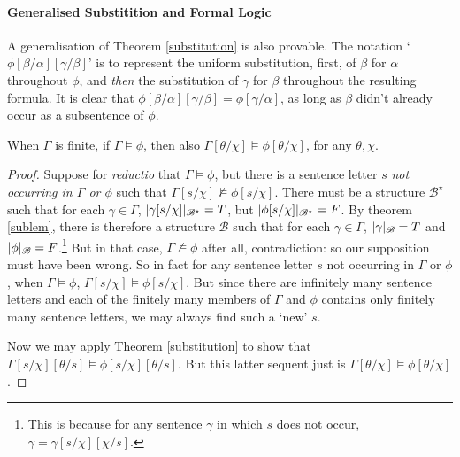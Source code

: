 \paragraph{Generalised Substitition and Formal Logic} A generalisation of Theorem \ref{substitution} is also provable. The notation ‘$\phi[\beta/\alpha][\gamma/\beta]$’ is to represent the uniform substitution, first, of $\beta$ for $\alpha$ throughout $\phi$, and \emph{then} the substitution of $\gamma$ for $\beta$ throughout the resulting formula. It is clear that $\phi[\beta/\alpha][\gamma/\beta] = \phi[\gamma/\alpha]$, as long as $\beta$ didn't already occur as a subsentence of $
\phi$. \begin{theorem}\label{generalsub}
	When $\Gamma$ is finite, if $\Gamma \vDash \phi$, then also $\Gamma[\theta/\chi] \vDash \phi[\theta/\chi]$, for any $\theta, \chi$. \begin{proof}
		Suppose for \emph{reductio} that $\Gamma \vDash \phi$, but there is a sentence letter $s$ \emph{not occurring in $\Gamma$ or $\phi$} such that $\Gamma[s/\chi] \nvDash\phi[s/\chi]$. There must be a structure $\mathscr{B^{\star}}$ such that for each $\gamma \in \Gamma$, $|\gamma[s/\chi]|_{\mathscr{B^{\star}}}=T$, but $|\phi[s/\chi]|_{\mathscr{B^{\star}}}=F$.
		By theorem \ref{sublem}, there is therefore a structure $\mathscr{B}$ such that for each $\gamma \in \Gamma$, $|\gamma|_{\mathscr{B}}=T$ and $|\phi|_{\mathscr{B}}=F$.\footnote{This is because for any sentence $\gamma$ in which $s$ does not occur, $\gamma = \gamma[s/\chi][\chi/s]$.} But in that case, $\Gamma \nvDash \phi$ after all, contradiction: so our supposition must have been wrong. So in fact for any sentence letter $s$ not occurring in $\Gamma$ or $\phi$, when $\Gamma \vDash \phi$, $\Gamma[s/\chi] \vDash \phi[s/\chi]$. 
But since there are infinitely many sentence letters and each of the finitely many members of $\Gamma$ and $\phi$ contains only finitely many sentence letters, we may always find such a `new' $s$.  

	Now we may apply Theorem \ref{substitution} to show that $\Gamma[s/\chi][\theta/s] \vDash \phi[s/\chi][\theta/s]$. But this latter sequent just is $\Gamma[\theta/\chi] \vDash \phi[\theta/\chi]$.
	\end{proof}
\end{theorem}
